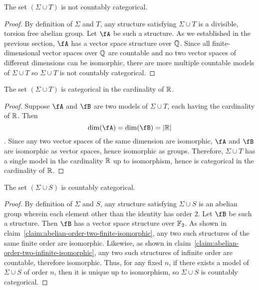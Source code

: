 \begin{claim}
  The set $(\Sigma \cup T)$ is not countably categorical.

  \begin{proof}
    By definition of $\Sigma$ and $T$, any structure satisfying $\Sigma \cup T$
    is a divisible, torsion free abelian group.
    Let $\fA$ be such a structure.
    As we established in the previous section, $\fA$ has a vector space structure over $\mathbb{Q}$.
    Since all finite-dimensional vector spaces over $\mathbb{Q}$ are countable and
    no two vector spaces of different dimensions can be isomorphic,
    there are more multiple countable models of $\Sigma \cup T$
    so $\Sigma \cup T$ is not countably categorical.
  \end{proof}
\end{claim}
\begin{claim}
  The set $(\Sigma \cup T)$ is categorical in the cardinality of $\mathbb{R}$.

  \begin{proof}
    Suppose $\fA$ and $\fB$ are two models of $\Sigma \cup T$,
    each having the cardinality of $\mathbb{R}$.
    Then \[ \dim(\fA) = \dim(\fB) = \abs{\R} \].
    Since any two vector spaces of the same dimension are isomorphic,
    $\fA$ and $\fB$ are isomorphic as vector spaces, hence
    isomorphic as groups.
    Therefore, $\Sigma \cup T$ has a single model in the cardinality $\mathbb{R}$
    up to isomorphism, hence is categorical in the cardinality of $\mathbb{R}$.
  \end{proof}
\end{claim}

\begin{claim}
  The set $(\Sigma \cup S)$ is countably categorical.

  \begin{proof}
    By definition of $\Sigma$ and $S$, any structure satisfying $\Sigma \cup S$
    is an abelian group wherein each element other than the identity has order $2$.
    Let $\fB$ be such a structure.
    Then $\fB$ has a vector space structure over $\mathbb{F}_2$.
    As shown in claim~\ref{claim:abelian-order-two-finite-isomorphic},
    any two such structures of the same finite order are isomorphic.
    Likewise, as shown in claim~\ref{claim:abelian-order-two-infinite-isomorphic},
    any two such structures of infinite order are countable, therefore isomorphic.
    Thus, for any fixed $n$, if there exists a model of $\Sigma \cup S$ of order $n$,
    then it is unique up to isomorphism, so $\Sigma \cup S$ is countably categorical.
  \end{proof}
\end{claim}




